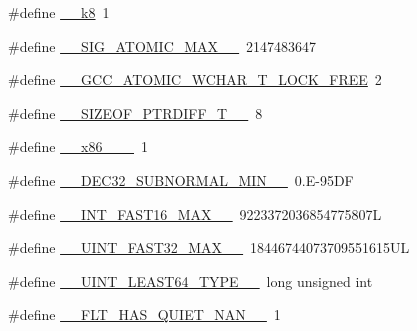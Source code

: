 \begin{DoxyCompactItemize}
\item 
\#define \hyperlink{build-analizer__host-_desktop___qt__5__9__0___g_c_c__64bit-debug_2moc__predefs_8h_a9b10b4191fdb9929f3210b21744efc41}{\+\_\+\+\_\+k8}~1
\item 
\#define \hyperlink{build-analizer__host-_desktop___qt__5__9__0___g_c_c__64bit-debug_2moc__predefs_8h_a9e75b72378b039587e4fc4006776826d}{\+\_\+\+\_\+\+S\+I\+G\+\_\+\+A\+T\+O\+M\+I\+C\+\_\+\+M\+A\+X\+\_\+\+\_\+}~2147483647
\item 
\#define \hyperlink{build-analizer__host-_desktop___qt__5__9__0___g_c_c__64bit-debug_2moc__predefs_8h_a775d1a831fa88d8c38c76d31947a8ebf}{\+\_\+\+\_\+\+G\+C\+C\+\_\+\+A\+T\+O\+M\+I\+C\+\_\+\+W\+C\+H\+A\+R\+\_\+\+T\+\_\+\+L\+O\+C\+K\+\_\+\+F\+R\+E\+E}~2
\item 
\#define \hyperlink{build-analizer__host-_desktop___qt__5__9__0___g_c_c__64bit-debug_2moc__predefs_8h_a2c1c95a99789b8c9721e896c48257f53}{\+\_\+\+\_\+\+S\+I\+Z\+E\+O\+F\+\_\+\+P\+T\+R\+D\+I\+F\+F\+\_\+\+T\+\_\+\+\_\+}~8
\item 
\#define \hyperlink{build-analizer__host-_desktop___qt__5__9__0___g_c_c__64bit-debug_2moc__predefs_8h_a9d2226f2d9644bcb9db4e3dda746f559}{\+\_\+\+\_\+x86\+\_\+\_\+\+\_\+}~1
\item 
\#define \hyperlink{build-analizer__host-_desktop___qt__5__9__0___g_c_c__64bit-debug_2moc__predefs_8h_a1b8832b164a1e36ed6756895a71c7e54}{\+\_\+\+\_\+\+D\+E\+C32\+\_\+\+S\+U\+B\+N\+O\+R\+M\+A\+L\+\_\+\+M\+I\+N\+\_\+\+\_\+}~0.\+E-\/95\+D\+F
\item 
\#define \hyperlink{build-analizer__host-_desktop___qt__5__9__0___g_c_c__64bit-debug_2moc__predefs_8h_ad4f33e46b6c0be1a2bbd83f3efe19165}{\+\_\+\+\_\+\+I\+N\+T\+\_\+\+F\+A\+S\+T16\+\_\+\+M\+A\+X\+\_\+\+\_\+}~9223372036854775807\+L
\item 
\#define \hyperlink{build-analizer__host-_desktop___qt__5__9__0___g_c_c__64bit-debug_2moc__predefs_8h_a61e63cea5ac78bcf0d282b70d63668e1}{\+\_\+\+\_\+\+U\+I\+N\+T\+\_\+\+F\+A\+S\+T32\+\_\+\+M\+A\+X\+\_\+\+\_\+}~18446744073709551615\+U\+L
\item 
\#define \hyperlink{build-analizer__host-_desktop___qt__5__9__0___g_c_c__64bit-debug_2moc__predefs_8h_a306a0b7c6f110b24a77083abaf3acc7a}{\+\_\+\+\_\+\+U\+I\+N\+T\+\_\+\+L\+E\+A\+S\+T64\+\_\+\+T\+Y\+P\+E\+\_\+\+\_\+}~long unsigned int
\item 
\#define \hyperlink{build-analizer__host-_desktop___qt__5__9__0___g_c_c__64bit-debug_2moc__predefs_8h_acb3a3a30075a9589b520df3b329df29e}{\+\_\+\+\_\+\+F\+L\+T\+\_\+\+H\+A\+S\+\_\+\+Q\+U\+I\+E\+T\+\_\+\+N\+A\+N\+\_\+\+\_\+}~1

\end{DoxyCompactItemize}
